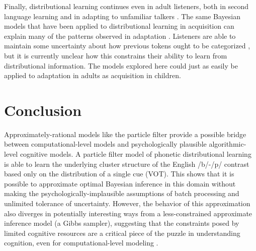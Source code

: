 \documentclass[10pt,letterpaper]{article}
\begin{document}
Finally, distributional learning continues even in adult listeners, both
in second language learning \autocite[e.g.,][]{Pajak2011a} and in
adapting to unfamiliar talkers \autocites{Clayards2008}{Xie2017a}. The
same Bayesian models that have been applied to distributional learning
in acquisition can explain many of the patterns observed in adaptation
\autocite{Kleinschmidt2015b}. Listeners are able to maintain some
uncertainty about how previous tokens ought to be categorized
\autocite{Bicknell}, but it is currently unclear how this constrains
their ability to learn from distributional information. The models
explored here could just as easily be applied to adaptation in adults as
acquisition in children.

\hypertarget{conclusion}{%
\section{Conclusion}\label{conclusion}}

Approximately-rational models like the particle filter provide a
possible bridge between computational-level models and psychologically
plausible algorithmic-level cognitive models. A particle filter model of
phonetic distributional learning is able to learn the underlying cluster
structure of the English /b/-/p/ contrast based only on the distribution
of a single cue (VOT). This shows that it is possible to approximate
optimal Bayesian inference in this domain without making the
psychologically-implausible assumptions of batch processing and
unlimited tolerance of uncertainty. However, the behavior of this
approximation also diverges in potentially interesting ways from a
less-constrained approximate inference model (a Gibbs sampler),
suggesting that the constraints posed by limited cognitive resources are
a critical piece of the puzzle in understanding cognition, even for
computational-level modeling \autocite{Marr1982}.


% 


\printbibliography
\end{document}
